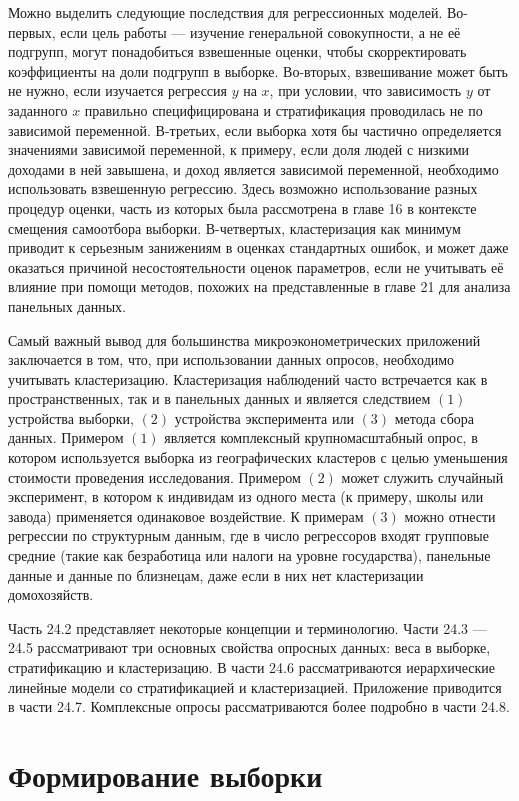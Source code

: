 Можно выделить следующие последствия для регрессионных моделей. Во-первых, если цель работы --- изучение генеральной совокупности, а не её подгрупп, могут понадобиться взвешенные оценки, чтобы скорректировать коэффициенты на доли подгрупп в выборке. Во-вторых, взвешивание может быть не нужно, если изучается регрессия $y$ на $x$, при условии, что зависимость $y$ от заданного $x$ правильно специфицирована и стратификация проводилась не по зависимой переменной. 
В-третьих, если выборка хотя бы частично определяется значениями зависимой переменной, к примеру, если доля людей с низкими доходами в ней завышена, и доход является зависимой переменной, необходимо использовать взвешенную регрессию. Здесь возможно использование разных процедур оценки, часть из которых была рассмотрена в главе 16 в контексте смещения самоотбора выборки. В-четвертых, кластеризация как минимум приводит к серьезным занижениям в оценках стандартных ошибок, и может даже оказаться причиной несостоятельности оценок параметров, если не учитывать её влияние при помощи методов, похожих на представленные в главе 21 для анализа панельных данных. 

Самый важный вывод для большинства микроэконометрических приложений заключается в том, что, при использовании данных опросов, необходимо учитывать кластеризацию. Кластеризация наблюдений часто встречается как в пространственных, так и в панельных данных и является следствием $(1)$ устройства выборки, $(2)$ устройства эксперимента или $(3)$ метода сбора данных. Примером $(1)$ является комплексный крупномасштабный опрос, в котором используется выборка из географических кластеров с целью уменьшения стоимости проведения исследования. Примером $(2)$ может служить случайный эксперимент, в котором к индивидам из одного места (к примеру, школы или завода) применяется одинаковое воздействие. К примерам $(3)$ можно отнести регрессии по структурным данным, где в число регрессоров входят групповые средние (такие как безработица или налоги на уровне государства), панельные данные и данные по близнецам, даже если в них нет кластеризации домохозяйств. 

Часть 24.2 представляет некоторые концепции и терминологию. Части 24.3 --- 24.5 рассматривают три основных свойства опросных данных: веса в выборке, стратификацию и кластеризацию. В части 24.6 рассматриваются иерархические линейные модели со стратификацией и кластеризацией. Приложение приводится в части 24.7. Комплексные опросы рассматриваются более подробно в части 24.8. 

\section{Формирование выборки}

